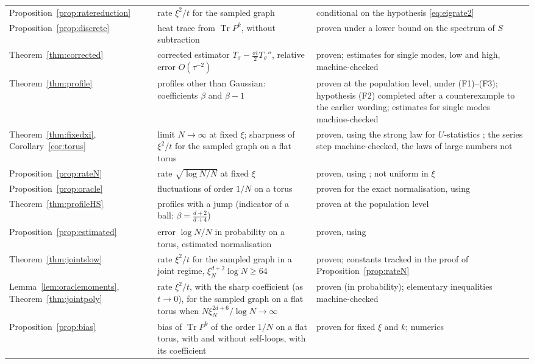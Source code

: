 \documentclass[11pt,a4paper]{article}
\theoremstyle{stmt}
\theoremstyle{defn}
\theoremstyle{rmk}
\numberwithin{equation}{section}
\DeclareMathOperator{\Tr}{Tr}
\begin{document}
{\begin{longtable}{@{}>{\raggedright\arraybackslash}p{}>{\raggedright\arraybackslash}p{}>{\raggedright\arraybackslash}p{}@{}}
Proposition~\ref{prop:ratereduction} & rate $\xi^2/t$ for the sampled graph & conditional on the hypothesis \eqref{eq:eigrate2}\\
Proposition~\ref{prop:discrete} & heat trace from $\Tr P^k$, without subtraction & proven under a lower bound on the spectrum of $S$\\
Theorem~\ref{thm:corrected} & corrected estimator $T_\sigma-\tfrac{\sigma t}2T_\sigma''$, relative error $O(\tau^{-2})$ & proven; estimates for single modes, low and high, machine-checked\\
Theorem~\ref{thm:profile} & profiles other than Gaussian: coefficients $\beta$ and $\beta-1$ & proven at the population level, under (F1)--(F3); hypothesis (F2) completed after a counterexample to the earlier wording; estimates for single modes machine-checked\\
Theorem~\ref{thm:fixedxi}, Corollary~\ref{cor:torus} & limit $N\to\infty$ at fixed $\xi$; sharpness of $\xi^2/t$ for the sampled graph on a flat torus & proven, using the strong law for $U$-statistics \cite{Serfling}; the series step machine-checked, the laws of large numbers not\\
Proposition~\ref{prop:rateN} & rate $\sqrt{\log N/N}$ at fixed $\xi$ & proven, using \cite{Hoeffding}; not uniform in $\xi$\\
Proposition~\ref{prop:oracle} & fluctuations of order $1/N$ on a torus & proven for the exact normalisation, using \cite{Serfling}\\
Theorem~\ref{thm:profileHS} & profiles with a jump (indicator of a ball: $\beta=\tfrac{d+2}{d+4}$) & proven at the population level\\
Proposition~\ref{prop:estimated} & error $\log N/N$ in probability on a torus, estimated normalisation & proven, using \cite{Hoeffding,Serfling}\\
Theorem~\ref{thm:jointslow} & rate $\xi^2/t$ for the sampled graph in a joint regime, $\xi_N^{d+2}\log N\ge64$ & proven; constants tracked in the proof of Proposition~\ref{prop:rateN}\\
Lemma~\ref{lem:oraclemoments}, Theorem~\ref{thm:jointpoly} & rate $\xi^2/t$, with the sharp coefficient (as $t\to0$), for the sampled graph on a flat torus when $N\xi_N^{2d+6}/\log N\to\infty$ & proven (in probability); elementary inequalities machine-checked\\
Proposition~\ref{prop:bias} & bias of $\Tr P^k$ of the order $1/N$ on a flat torus, with and without self-loops, with its coefficient & proven for fixed $\xi$ and $k$; numerics\\

\end{longtable}}
\end{document}
